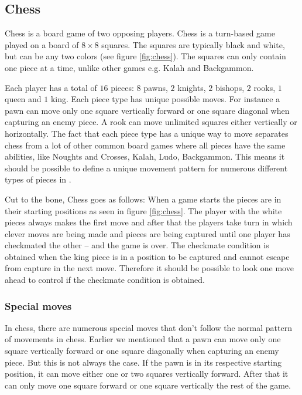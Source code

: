 \subsection{Chess}
Chess is a board game of two opposing players. Chess is a turn-based game played
on a board of $8 \times 8$ squares. The squares are typically black and white,
but can be any two colors (see figure \ref{fig:chess}). The squares can only
contain one piece at a time, unlike other games e.g. Kalah and Backgammon. 

Each player has a total of $16$ pieces: $8$ pawns, $2$ knights, $2$
bishops, $2$ rooks, $1$ queen and $1$ king. Each piece type has unique
possible moves. For instance a pawn can move only one square vertically
forward or one square diagonal when capturing an enemy piece. A rook
can move unlimited squares either vertically or horizontally. The fact
that each piece type has a unique way to move separates chess from a lot
of other common board games where all pieces have the same abilities,
like Noughts and Crosses, Kalah, Ludo, Backgammon. This means it should
be possible to define a unique movement pattern for numerous different
types of pieces in \productname{}.

Cut to the bone, Chess goes as follows: When a game starts the pieces are in their
starting positions as seen in figure \ref{fig:chess}. The player with the white
pieces always makes the first move and after that the players take turn in
which clever moves are being made and pieces are being captured until one
player has checkmated the other -- and the game is over. The checkmate condition
is obtained when the king piece is in a position to be captured and cannot
escape from capture in the next move\cite{chessrules}. Therefore it should be
possible to look one move ahead to control if the checkmate condition is
obtained.

\subsubsection{Special moves} 
In chess, there are numerous special moves that don't follow the normal pattern
of movements in chess. Earlier we mentioned that a pawn can move only one square
vertically forward or one square diagonally when capturing an enemy piece. But
this is not always the case. If the pawn is in its respective starting position, it
can move either one or two squares vertically forward. After that it can only
move one square forward or one square vertically the rest of the game. 

